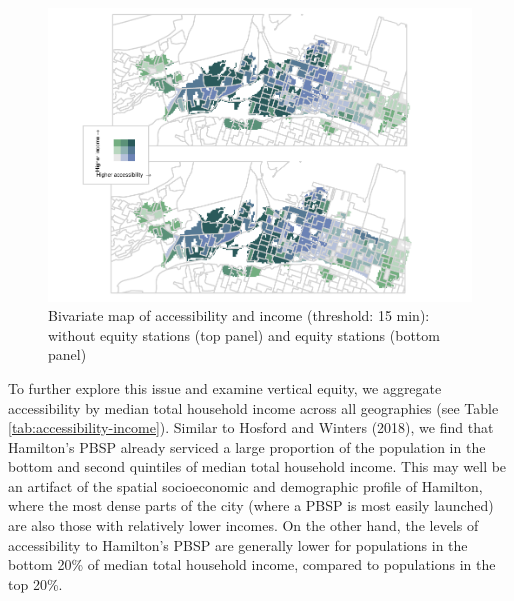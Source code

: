 \documentclass[]{elsarticle} %
\begin{document}
\begin{figure}
\includegraphics[width=1\linewidth]{Bike-share-spatial-equity_files/figure-latex/figure-bi-map-threshold-15-1} \caption{\label{fig-bivariate-map-threshold-15}Bivariate map of accessibility and income (threshold: 15 min): without equity stations (top panel) and equity stations (bottom panel)}\label{fig:figure-bi-map-threshold-15}
\end{figure}

To further explore this issue and examine vertical equity, we aggregate
accessibility by median total household income across all geographies
(see Table \ref{tab:accessibility-income}). Similar to Hosford and
Winters (2018), we find that Hamilton's PBSP already serviced a large
proportion of the population in the bottom and second quintiles of
median total household income. This may well be an artifact of the
spatial socioeconomic and demographic profile of Hamilton, where the
most dense parts of the city (where a PBSP is most easily launched) are
also those with relatively lower incomes. On the other hand, the levels
of accessibility to Hamilton's PBSP are generally lower for populations
in the bottom 20\% of median total household income, compared to
populations in the top 20\%.
\end{document}
